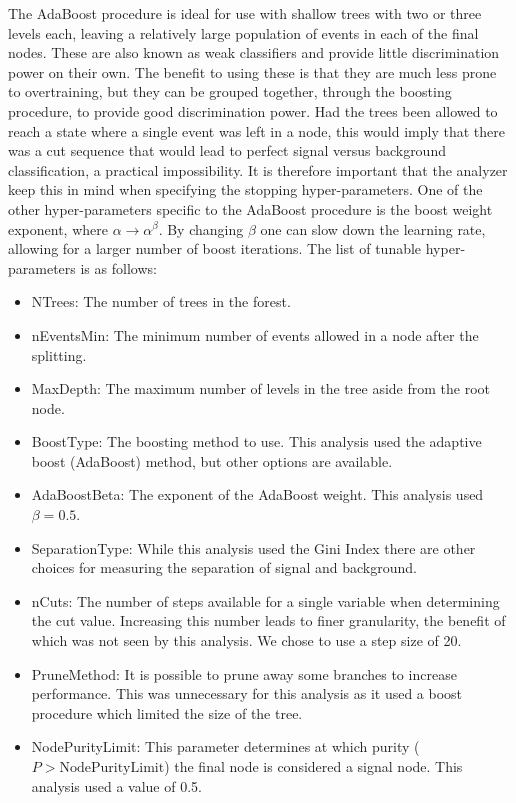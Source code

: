 The AdaBoost procedure is ideal for use with shallow trees with two or three levels each, leaving a relatively large population of events in each of the final nodes.
These are also known as weak classifiers and provide little discrimination power on their own.
The benefit to using these is that they are much less prone to overtraining, but they can be grouped together, through the boosting procedure, to provide good discrimination power.
Had the trees been allowed to reach a state where a single event was left in a node, this would imply that there was a cut sequence that would lead to perfect signal versus background classification, a practical impossibility.
It is therefore important that the analyzer keep this in mind when specifying the stopping hyper-parameters.
One of the other hyper-parameters specific to the AdaBoost procedure is the boost weight exponent, where $\alpha{\rightarrow}\alpha^{\beta}$.
By changing $\beta$ one can slow down the learning rate, allowing for a larger number of boost iterations.
The list of tunable hyper-parameters is as follows:
\begin{itemize}
  \item NTrees: The number of trees in the forest.
  \item nEventsMin: The minimum number of events allowed in a node after the splitting.
  \item MaxDepth: The maximum number of levels in the tree aside from the root node.
  \item BoostType: The boosting method to use. This analysis used the adaptive boost (AdaBoost) method, but other options are available.
  \item AdaBoostBeta: The exponent of the AdaBoost weight. This analysis used $\beta=0.5$.
  \item SeparationType: While this analysis used the Gini Index there are other choices for measuring the separation of signal and background.
  \item nCuts: The number of steps available for a single variable when determining the cut value. Increasing this number leads to finer granularity, the benefit of which was not seen by this analysis. We chose to use a step size of 20.
  \item PruneMethod: It is possible to prune away some branches to increase performance. This was unnecessary for this analysis as it used a boost procedure which limited the size of the tree.
  \item NodePurityLimit: This parameter determines at which purity ($P>\text{NodePurityLimit}$) the final node is considered a signal node. This analysis used a value of 0.5.
\end{itemize}

